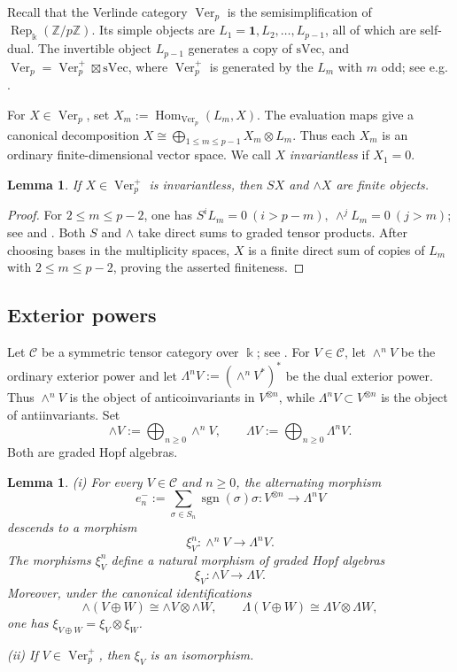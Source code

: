\documentclass[12pt]{amsart}
\newtheorem{lemma}[theorem]{Lemma}
\theoremstyle{remark}
\DeclareMathOperator{\Ver}{Ver}
\DeclareMathOperator{\Rep}{Rep}
\DeclareMathOperator{\Hom}{Hom}
\newcommand{\kk}{\Bbbk}
\newcommand{\cC}{\mathcal C}
\newcommand{\one}{\mathbf 1}
\begin{document}
Recall that the Verlinde category $\Ver_p$ is the semisimplification of
$\Rep_{\kk}(\mathbb Z/p\mathbb Z)$.  Its simple objects are
$L_1=\one,L_2,\dots,L_{p-1}$, all of which are self-dual.  The invertible object $L_{p-1}$ generates a copy
of $\mathrm{sVec}$, and $\Ver_p=\Ver_p^+\boxtimes\mathrm{sVec}$, 
where $\Ver_p^+$ is generated by the $L_m$ with $m$ odd; see e.g. 
\cite{EOV17,Eti18}.

For $X\in\Ver_p$, set
$X_m:=\Hom_{\Ver_p}(L_m,X)$. 
The evaluation maps give a canonical decomposition
$
 X\cong\bigoplus_{1\leq m\leq p-1}X_m\otimes L_m.
$
Thus each $X_m$ is an ordinary finite-dimensional vector space.  We call $X$
\emph{invariantless} if $X_1=0$.

\begin{lemma}\label{lem:finiteness}
If $X\in\Ver_p^+$ is invariantless, then $SX$ and $\wedge X$ are finite
objects.  
\end{lemma}

\begin{proof}
For $2\leq m\leq p-2$, one has
$S^iL_m=0\ (i>p-m),\ 
 \wedge^jL_m=0\ (j>m)$;
see \cite[Proposition~2.4]{EOV17} and \cite[Proposition~5.1]{Eti18}.
Both $S$ and $\wedge$ take direct sums to graded tensor products.  After
choosing bases in the multiplicity spaces, $X$ is a finite direct sum of copies
of $L_m$ with $2\leq m\leq p-2$, proving the asserted finiteness.
\end{proof}


\subsection{Exterior powers}\label{subsec:exterior-conventions}

Let $\cC$ be a symmetric tensor category over $\kk$; see
\cite[Definitions~4.1.1, 8.1.1, and 8.1.12]{EGNO15}.  For $V\in\cC$, let
$\wedge^nV$ be the ordinary exterior power and let
$\Lambda^nV:=\left(\wedge^nV^*\right)^*$
be the dual exterior power.  Thus $\wedge^nV$ is the object of
anticoinvariants in $V^{\otimes n}$, while $\Lambda^nV\subset V^{\otimes n}$
is the object of antiinvariants.  Set
\[
 \wedge V:=\bigoplus_{n\geq0}\wedge^nV,
 \qquad
 \Lambda V:=\bigoplus_{n\geq0}\Lambda^nV.
\]
Both are graded Hopf algebras.

\begin{lemma}\label{lem:exterior-comparison}
(i) For every $V\in\cC$ and $n\geq0$, the alternating morphism
\[
 e_n^-:=\sum_{\sigma\in S_n}\operatorname{sgn}(\sigma)\sigma:
 V^{\otimes n}\longrightarrow\Lambda^nV
\]
descends to a morphism
\[
 \xi_V^n:\wedge^nV\longrightarrow\Lambda^nV.
\]
The morphisms $\xi_V^n$ define a natural morphism of graded Hopf algebras
\[
 \xi_V:\wedge V\longrightarrow\Lambda V.
\]
Moreover, under the canonical identifications
\[
 \wedge(V\oplus W)\cong\wedge V\otimes\wedge W,
 \qquad
 \Lambda(V\oplus W)\cong\Lambda V\otimes\Lambda W,
\]
one has $\xi_{V\oplus W}=\xi_V\otimes\xi_W$.  

(ii) If $V\in\Ver_p^+$, then
$\xi_V$ is an isomorphism.
\end{lemma}
\end{document}
